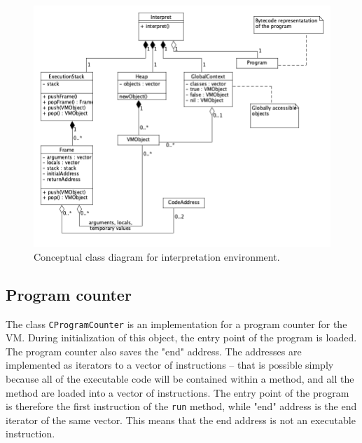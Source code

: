 \documentclass[thesis=M,english]{FITthesis}[2019/12/23]
\begin{document}
\begin{figure}[h!]
	\centering
	\includegraphics[width=\textwidth]{media/interpret_class.png}
	\caption{Conceptual class diagram for interpretation environment.}
	\label{fig:interpret_classDiagram}
\end{figure}

\subsection{Program counter}
The class \texttt{CProgramCounter} is an implementation for a program counter for the VM. During initialization of this object, the entry point of the program is loaded.
The program counter also saves the "end" address. The addresses are implemented as iterators to a vector of instructions -- that is possible simply because all of the
executable code will be contained within a method, and all the method are loaded into a vector of instructions. The entry point of the program is therefore the first
instruction of the \texttt{run} method, while "end" address is the end iterator of the same vector. This means that the end address is not an executable instruction.
\end{document}

